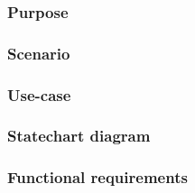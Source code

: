 \subsubsection{Purpose}

\subsubsection{Scenario}

\subsubsection{Use-case}

\subsubsection{Statechart diagram}

\subsubsection{Functional requirements}